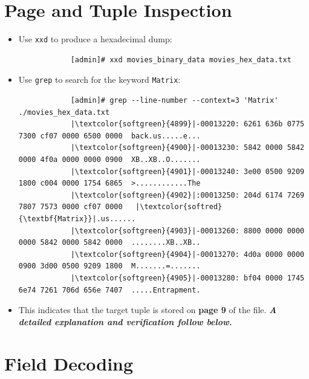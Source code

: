 \documentclass[10pt,a4paper]{article}
\begin{document}
\section{Page and Tuple Inspection}

\begin{itemize}
    \item Use \texttt{xxd} to produce a hexadecimal dump:
          \begin{verbatim}
            [admin]# xxd movies_binary_data movies_hex_data.txt
          \end{verbatim}
    \item Use \texttt{grep} to search for the keyword
          \texttt{Matrix}:
          \begin{verbatim}
            [admin]# grep --line-number --context=3 'Matrix' ./movies_hex_data.txt
            |\textcolor{softgreen}{4899}|-00013220: 6261 636b 0775 7300 cf07 0000 6500 0000  back.us.....e...
            |\textcolor{softgreen}{4900}|-00013230: 5842 0000 5842 0000 4f0a 0000 0000 0900  XB..XB..O.......
            |\textcolor{softgreen}{4901}|-00013240: 3e00 0500 9209 1800 c004 0000 1754 6865  >............The
            |\textcolor{softgreen}{4902}|:00013250: 204d 6174 7269 7807 7573 0000 cf07 0000   |\textcolor{softred}{\textbf{Matrix}}|.us......
            |\textcolor{softgreen}{4903}|-00013260: 8800 0000 0000 0000 5842 0000 5842 0000  ........XB..XB..
            |\textcolor{softgreen}{4904}|-00013270: 4d0a 0000 0000 0900 3d00 0500 9209 1800  M.......=.......
            |\textcolor{softgreen}{4905}|-00013280: bf04 0000 1745 6e74 7261 706d 656e 7407  .....Entrapment.
          \end{verbatim}
    \item This indicates that the target tuple is stored on \textbf{page 9} of
          the file. \textbf{\textit{A detailed explanation and verification
          follow below.}}
\end{itemize}

\section{Field Decoding}
\end{document}
